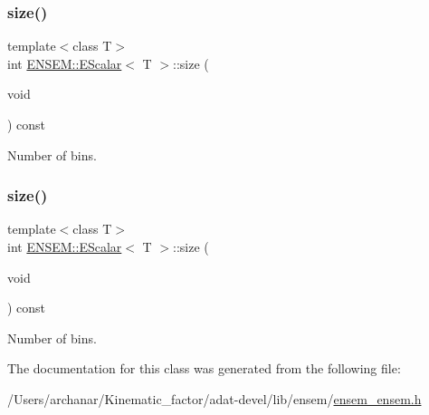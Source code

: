 \subsubsection{\texorpdfstring{size()}{size()}\hspace{0.1cm}{\footnotesize\ttfamily [2/3]}}
{\footnotesize\ttfamily template$<$class T$>$ \\
int \mbox{\hyperlink{classENSEM_1_1EScalar}{E\+N\+S\+E\+M\+::\+E\+Scalar}}$<$ T $>$\+::size (\begin{DoxyParamCaption}\item[{void}]{ }\end{DoxyParamCaption}) const\hspace{0.3cm}{\ttfamily [inline]}}



Number of bins. 

\mbox{\label{classENSEM_1_1EScalar_a314f162d71b15a8eb7e3382a274aa12b}} 
\subsubsection{\texorpdfstring{size()}{size()}\hspace{0.1cm}{\footnotesize\ttfamily [3/3]}}
{\footnotesize\ttfamily template$<$class T$>$ \\
int \mbox{\hyperlink{classENSEM_1_1EScalar}{E\+N\+S\+E\+M\+::\+E\+Scalar}}$<$ T $>$\+::size (\begin{DoxyParamCaption}\item[{void}]{ }\end{DoxyParamCaption}) const\hspace{0.3cm}{\ttfamily [inline]}}



Number of bins. 



The documentation for this class was generated from the following file\+:\begin{DoxyCompactItemize}
\item 
/\+Users/archanar/\+Kinematic\+\_\+factor/adat-\/devel/lib/ensem/\mbox{\hyperlink{adat-devel_2lib_2ensem_2ensem__ensem_8h}{ensem\+\_\+ensem.\+h}}\end{DoxyCompactItemize}
